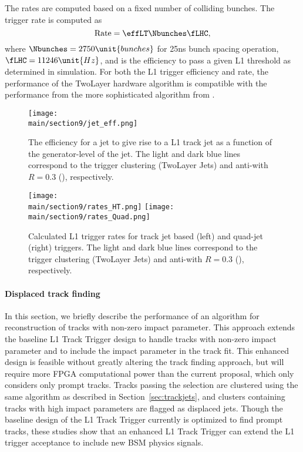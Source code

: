 The rates are computed based on a fixed number of colliding bunches. The trigger rate is computed as
\begin{equation*}
  \text{Rate} = \effLT \Nbunches \fLHC,
\end{equation*}
where $\Nbunches=2750\unit{bunches}$ for 25\unit{ns} bunch spacing operation, $\fLHC = 11246\unit{Hz}$, and \effLT is the efficiency to pass a given L1 threshold as determined
in simulation. For both the L1 trigger efficiency and rate, the performance of the TwoLayer hardware algorithm is compatible with the performance from the more sophisticated algorithm
from \FASTJET.

\begin{figure*}[hbtp]\centering
 \texttt{[image: \\main/section9/jet\_eff.png]}
 \caption{The efficiency for a jet to give rise to a L1 track jet as a function of the generator-level \pt of the jet.
 The light and dark blue lines correspond to the trigger clustering (TwoLayer Jets) and anti-\kt with $R =0.3$ (\FASTJET), respectively.}
  \label{fig:jeteff}
\end{figure*}%

\begin{figure*}[hbtp]\centering
 \texttt{[image: \\main/section9/rates\_HT.png]}
 \texttt{[image: \\main/section9/rates\_Quad.png]}
 \caption{Calculated L1 trigger rates for track jet based \HT (left) and quad-jet (right) triggers.
 The light and dark blue lines correspond to the trigger clustering (TwoLayer Jets) and anti-\kt with $R =0.3$ (\FASTJET), respectively.}
  \label{fig:rates}
\end{figure*}%

\paragraph{Displaced track finding}

In this section, we briefly describe the performance of an algorithm for reconstruction of tracks with non-zero impact parameter. This approach extends the baseline L1 Track Trigger design to 
handle tracks with non-zero impact parameter and to include the impact parameter in the track fit. This enhanced design is feasible without greatly altering the track finding approach, but will 
require more FPGA computational power than the current proposal, which only considers only prompt tracks. Tracks passing the selection are clustered using the same algorithm as described in Section~\ref{sec:trackjets}, 
and clusters containing tracks with high impact parameters are flagged as displaced jets. Though the baseline design of the L1 Track Trigger currently is optimized to find prompt tracks, these 
studies show that an enhanced L1 Track Trigger can extend the L1 trigger acceptance to include new BSM physics signals.

